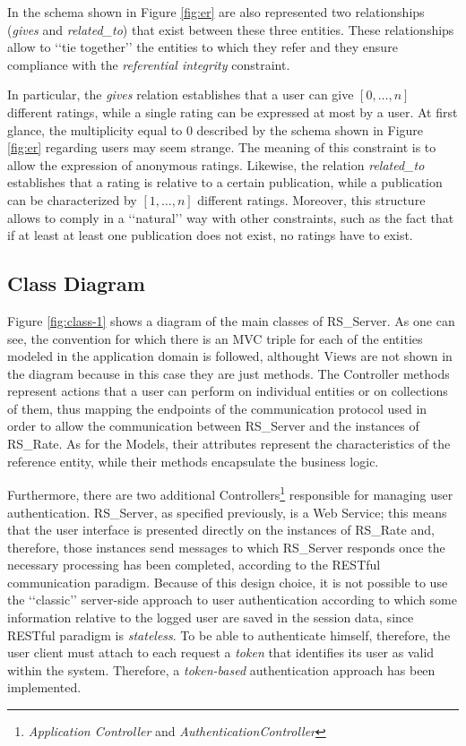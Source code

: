 \documentclass[a4paper, english]{article}
\begin{document}
In the schema shown in Figure \ref{fig:er} are also represented two relationships (\emph{gives} and \emph{related\_to}) that exist between these three entities. These relationships allow to \lq\lq tie together\rq\rq{} the entities to which they refer and they ensure compliance with the \emph{referential integrity} constraint.

In particular, the \emph{gives} relation establishes that a user can give $[0,\dots ,n]$ different ratings, while a single rating can be expressed at most by a user. At first glance, the multiplicity equal to $0$ described by the schema shown in Figure \ref{fig:er} regarding users may seem strange. The meaning of this constraint is to allow the expression of anonymous ratings. Likewise, the relation \emph{related\_to} establishes that a rating is relative to a certain  publication, while a publication can be characterized by $[1,\dots ,n]$ different ratings. Moreover, this structure allows to comply in a \lq\lq natural\rq\rq{} way with other constraints, such as the fact that if at least at least one publication does not exist, no ratings have to exist.

\subsection{Class Diagram}

Figure \ref{fig:class-1} shows a diagram of the main classes of RS\_Server. As one can see, the convention for which there is an MVC triple for each of the entities modeled in the application domain is followed, althought Views are not shown in the diagram because in this case they are just methods. The Controller methods represent actions that a user can perform on individual entities or on collections of them, thus mapping the endpoints of the communication protocol used in order to allow the communication between RS\_Server and the instances of RS\_Rate. As for the Models, their attributes represent the characteristics of the reference entity, while their methods encapsulate the business logic.

Furthermore, there are two additional Controllers\footnote{\emph{Application Controller} and \emph{AuthenticationController}} responsible for managing user authentication. RS\_Server, as specified previously, is a Web Service; this means that the user interface is presented directly on the instances of RS\_Rate and, therefore, those instances send messages to which RS\_Server responds once the necessary processing has been completed, according to the RESTful communication paradigm. Because of this design choice, it is not possible to use the \lq\lq classic\rq\rq{} server-side approach to user authentication according to which some information relative to the logged user are saved in the session data, since RESTful paradigm is \emph{stateless}. To be able to authenticate himself, therefore, the user client must attach to each request a \emph{token} that identifies its user as valid within the system. Therefore, a \emph{token-based} authentication approach has been implemented.
\end{document}
